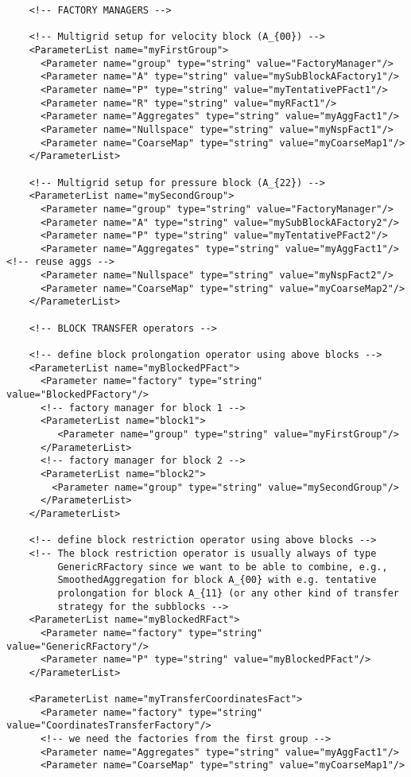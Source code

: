 \documentclass[10pt,fleqn]{book}
\begin{document}
\begin{lstlisting}
    <!-- FACTORY MANAGERS -->

    <!-- Multigrid setup for velocity block (A_{00}) -->
    <ParameterList name="myFirstGroup">
      <Parameter name="group" type="string" value="FactoryManager"/>
      <Parameter name="A" type="string" value="mySubBlockAFactory1"/>
      <Parameter name="P" type="string" value="myTentativePFact1"/>
      <Parameter name="R" type="string" value="myRFact1"/>
      <Parameter name="Aggregates" type="string" value="myAggFact1"/>
      <Parameter name="Nullspace" type="string" value="myNspFact1"/>
      <Parameter name="CoarseMap" type="string" value="myCoarseMap1"/>
    </ParameterList>

    <!-- Multigrid setup for pressure block (A_{22}) -->
    <ParameterList name="mySecondGroup">
      <Parameter name="group" type="string" value="FactoryManager"/>
      <Parameter name="A" type="string" value="mySubBlockAFactory2"/>
      <Parameter name="P" type="string" value="myTentativePFact2"/>
      <Parameter name="Aggregates" type="string" value="myAggFact1"/><!-- reuse aggs -->
      <Parameter name="Nullspace" type="string" value="myNspFact2"/>
      <Parameter name="CoarseMap" type="string" value="myCoarseMap2"/>
    </ParameterList>

    <!-- BLOCK TRANSFER operators -->

    <!-- define block prolongation operator using above blocks -->
    <ParameterList name="myBlockedPFact">
      <Parameter name="factory" type="string" value="BlockedPFactory"/>
      <!-- factory manager for block 1 -->
      <ParameterList name="block1">
         <Parameter name="group" type="string" value="myFirstGroup"/>
      </ParameterList>
      <!-- factory manager for block 2 -->
      <ParameterList name="block2">
        <Parameter name="group" type="string" value="mySecondGroup"/>
      </ParameterList>
    </ParameterList>

    <!-- define block restriction operator using above blocks -->
    <!-- The block restriction operator is usually always of type
         GenericRFactory since we want to be able to combine, e.g.,
         SmoothedAggregation for block A_{00} with e.g. tentative
         prolongation for block A_{11} (or any other kind of transfer
         strategy for the subblocks -->
    <ParameterList name="myBlockedRFact">
      <Parameter name="factory" type="string" value="GenericRFactory"/>
      <Parameter name="P" type="string" value="myBlockedPFact"/>
    </ParameterList>

    <ParameterList name="myTransferCoordinatesFact">
      <Parameter name="factory" type="string" value="CoordinatesTransferFactory"/>
      <!-- we need the factories from the first group -->      
      <Parameter name="Aggregates" type="string" value="myAggFact1"/>
      <Parameter name="CoarseMap" type="string" value="myCoarseMap1"/>


\end{lstlisting}
\end{document}
